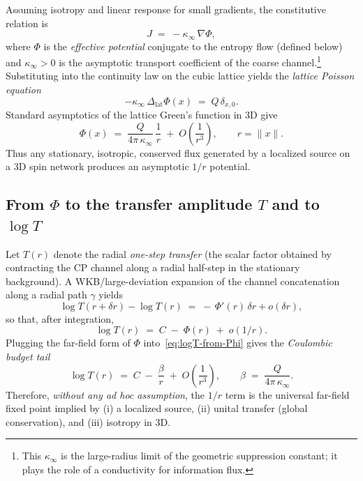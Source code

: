 \documentclass[11pt]{article}
\theoremstyle{plain}
\theoremstyle{definition}
\begin{document}
Assuming isotropy and linear response for small gradients, the constitutive relation is
\[
  J \;=\; -\kappa_\infty \,\nabla \Phi,
\]
where $\Phi$ is the \emph{effective potential} conjugate to the entropy flow (defined below) and $\kappa_\infty>0$ is the asymptotic transport coefficient of the coarse channel.\footnote{This $\kappa_\infty$ is the large-radius limit of the geometric suppression constant; it plays the role of a conductivity for information flux.}
Substituting into the continuity law on the cubic lattice yields the \emph{lattice Poisson equation}
\begin{equation}\label{eq:lattice-poisson}
  -\kappa_\infty \,\Delta_{\mathrm{lat}} \Phi(x) \;=\; Q\,\delta_{x,0}.
\end{equation}
Standard asymptotics of the lattice Green’s function in 3D give
\[
  \Phi(x) \;=\; \frac{Q}{4\pi\,\kappa_\infty}\,\frac{1}{r} \;+\; O\!\left(\frac{1}{r^3}\right)\!, \qquad r=\|x\|.
\]
Thus any stationary, isotropic, conserved flux generated by a localized source on a 3D spin network produces an asymptotic \(1/r\) potential.

\subsection{From $\Phi$ to the transfer amplitude $T$ and to \(\log T\)}
Let $T(r)$ denote the radial \emph{one-step transfer} (the scalar factor obtained by contracting the CP channel along a radial half-step in the stationary background).
A WKB/large-deviation expansion of the channel concatenation along a radial path $\gamma$ yields
\[
  \log T(r+\delta r) - \log T(r) \;=\; -\,\Phi'(r)\,\delta r + o(\delta r),
\]
so that, after integration,
\begin{equation}\label{eq:logT-from-Phi}
  \log T(r) \;=\; C \;-\; \Phi(r) \;+\; o(1/r).
\end{equation}
Plugging the far-field form of $\Phi$ into~\eqref{eq:logT-from-Phi} gives the \emph{Coulombic budget tail}
\begin{equation}\label{eq:coulomb-tail}
  \log T(r) \;=\; C \;-\; \frac{\beta}{r} \;+\; O\!\left(\frac{1}{r^3}\right), \qquad
  \beta \;=\; \frac{Q}{4\pi\,\kappa_\infty}.
\end{equation}
Therefore, \emph{without any ad hoc assumption}, the $1/r$ term is the universal far-field fixed point implied by (i) a localized source, (ii) unital transfer (global conservation), and (iii) isotropy in 3D.
\end{document}
